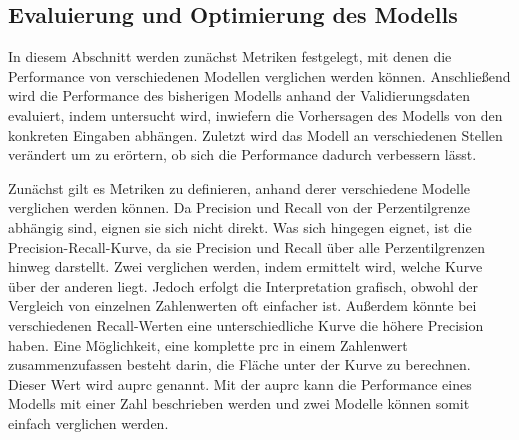 \subsection{Evaluierung und Optimierung des Modells}
\label{sec:EvaluierungOptimierung}
In diesem Abschnitt werden zunächst Metriken festgelegt, mit denen die Performance von verschiedenen Modellen verglichen werden können.
Anschließend wird die Performance des bisherigen Modells anhand der Validierungsdaten evaluiert, indem untersucht wird, inwiefern die Vorhersagen des Modells von den konkreten Eingaben abhängen.
Zuletzt wird das Modell an verschiedenen Stellen verändert um zu erörtern, ob sich die Performance dadurch verbessern lässt.

Zunächst gilt es Metriken zu definieren, anhand derer verschiedene Modelle verglichen werden können.
Da Precision und Recall von der Perzentilgrenze abhängig sind, eignen sie sich nicht direkt.
Was sich hingegen eignet, ist die Precision-Recall-Kurve, da sie Precision und Recall über alle Perzentilgrenzen hinweg darstellt.
Zwei  verglichen werden, indem ermittelt wird, welche Kurve über der anderen liegt.
Jedoch erfolgt die Interpretation grafisch, obwohl der Vergleich von einzelnen Zahlenwerten oft einfacher ist.
Außerdem könnte bei verschiedenen Recall-Werten eine unterschiedliche Kurve die höhere Precision haben.
Eine Möglichkeit, eine komplette \acrshort{prc} in einem Zahlenwert zusammenzufassen besteht darin, die Fläche unter der Kurve zu berechnen.
Dieser Wert wird \acrfull{auprc} genannt.
Mit der \acrshort{auprc} kann die Performance eines Modells mit einer Zahl beschrieben werden und zwei Modelle können somit einfach verglichen werden.

